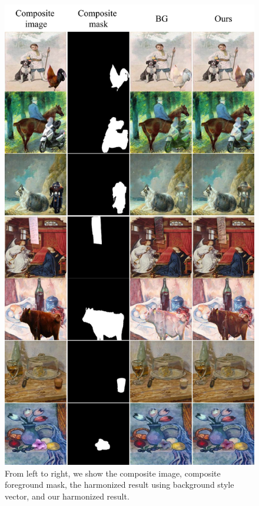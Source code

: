 \documentclass[letterpaper]{article} %
\begin{document}
\begin{figure}[t]
\centering
\includegraphics[width=0.92\linewidth]{figures/out_of_COCO_aug.jpg}
\caption{From left to right, we show the composite image, composite foreground mask, the harmonized result using background style vector, and our harmonized result.}
\label{fig:out_of_COCO}
\end{figure}
\end{document}
